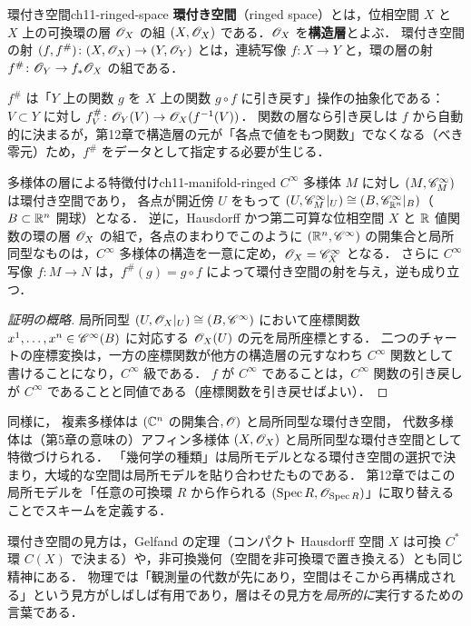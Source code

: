 \begin{mydef}{環付き空間}{ch11-ringed-space}
\textbf{環付き空間}（ringed space）とは，位相空間 $X$ と $X$ 上の可換環の層 $\mathscr{O}_X$ の組 $(X,\mathscr{O}_X)$ である．$\mathscr{O}_X$ を\textbf{構造層}とよぶ．
環付き空間の射 $(f,f^\#)\colon(X,\mathscr{O}_X)\to(Y,\mathscr{O}_Y)$ とは，連続写像 $f\colon X\to Y$ と，環の層の射 $f^\#\colon\mathscr{O}_Y\to f_*\mathscr{O}_X$ の組である．
\end{mydef}

$f^\#$ は「$Y$ 上の関数 $g$ を $X$ 上の関数 $g\circ f$ に引き戻す」操作の抽象化である：$V\subset Y$ に対し $f^\#_V\colon\mathscr{O}_Y(V)\to\mathscr{O}_X(f^{-1}(V))$．
関数の層なら引き戻しは $f$ から自動的に決まるが，第12章で構造層の元が「各点で値をもつ関数」でなくなる（べき零元）ため，$f^\#$ をデータとして指定する必要が生じる．

\begin{mythm}{多様体の層による特徴付け}{ch11-manifold-ringed}
$C^\infty$ 多様体 $M$ に対し $(M,\mathscr{C}^\infty_M)$ は環付き空間であり，
各点が開近傍 $U$ をもって $(U,\mathscr{C}^\infty_M|_U)\cong(B,\mathscr{C}^\infty_{\mathbb{R}^n}|_B)$（$B\subset\mathbb{R}^n$ 開球）となる．
逆に，Hausdorff かつ第二可算な位相空間 $X$ と $\mathbb{R}$ 値関数の環の層 $\mathscr{O}_X$ の組で，各点のまわりでこのように $(\mathbb{R}^n,\mathscr{C}^\infty)$ の開集合と局所同型なものは，$C^\infty$ 多様体の構造を一意に定め，$\mathscr{O}_X=\mathscr{C}^\infty_X$ となる．
さらに $C^\infty$ 写像 $f\colon M\to N$ は，$f^\#(g)=g\circ f$ によって環付き空間の射を与え，逆も成り立つ．
\end{mythm}
\begin{proof}[証明の概略]
局所同型 $(U,\mathscr{O}_X|_U)\cong(B,\mathscr{C}^\infty)$ において座標関数 $x^1,\dots,x^n\in\mathscr{C}^\infty(B)$ に対応する $\mathscr{O}_X(U)$ の元を局所座標とする．
二つのチャートの座標変換は，一方の座標関数が他方の構造層の元すなわち $C^\infty$ 関数として書けることになり，$C^\infty$ 級である．
$f$ が $C^\infty$ であることは，$C^\infty$ 関数の引き戻しが $C^\infty$ であることと同値である（座標関数を引き戻せばよい）．
\end{proof}

同様に，
複素多様体は $(\mathbb{C}^n$ の開集合$,\mathscr{O})$ と局所同型な環付き空間，
代数多様体は（第5章の意味の）アフィン多様体 $(X,\mathscr{O}_X)$ と局所同型な環付き空間として特徴づけられる．
「幾何学の種類」は局所モデルとなる環付き空間の選択で決まり，大域的な空間は局所モデルを貼り合わせたものである．
第12章ではこの局所モデルを「任意の可換環 $R$ から作られる $(\operatorname{Spec} R,\mathscr{O}_{\operatorname{Spec} R})$」に取り替えることでスキームを定義する．

\begin{physbox}
環付き空間の見方は，Gelfand の定理（コンパクト Hausdorff 空間 $X$ は可換 $C^*$ 環 $C(X)$ で決まる）や，非可換幾何（空間を非可換環で置き換える）とも同じ精神にある．
物理では「観測量の代数が先にあり，空間はそこから再構成される」という見方がしばしば有用であり，層はその見方を\emph{局所的に}実行するための言葉である．
\end{physbox}

